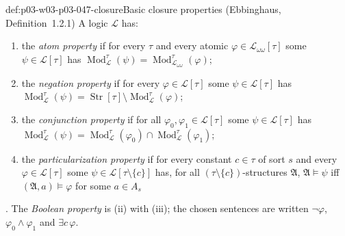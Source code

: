 \begin{hbdefinition}{def:p03-w03-p03-047-closure}{Basic closure properties (Ebbinghaus, Definition~1.2.1)}
A logic \(\mathscr L\) has:
\begin{enumerate}
 \item[(i)] the \emph{atom property} if for every \(\tau\) and every atomic
       \(\varphi\in\mathscr L_{\omega\omega}[\tau]\) some
       \(\psi\in\mathscr L[\tau]\) has
       \(\operatorname{Mod}^\tau_{\mathscr L}(\psi)=\operatorname{Mod}^\tau_{\mathscr L_{\omega\omega}}(\varphi)\);
 \item[(ii)] the \emph{negation property} if for every
       \(\varphi\in\mathscr L[\tau]\) some \(\psi\in\mathscr L[\tau]\) has
       \(\operatorname{Mod}^\tau_{\mathscr L}(\psi)=\operatorname{Str}[\tau]\setminus\operatorname{Mod}^\tau_{\mathscr L}(\varphi)\);
 \item[(iii)] the \emph{conjunction property} if for all
       \(\varphi_0,\varphi_1\in\mathscr L[\tau]\) some
       \(\psi\in\mathscr L[\tau]\) has
       \(\operatorname{Mod}^\tau_{\mathscr L}(\psi)=\operatorname{Mod}^\tau_{\mathscr L}(\varphi_0)\cap\operatorname{Mod}^\tau_{\mathscr L}(\varphi_1)\);
 \item[(iv)] the \emph{particularization property} if for every constant
       \(c\in\tau\) of sort \(s\) and every \(\varphi\in\mathscr L[\tau]\)
       some \(\psi\in\mathscr L[\tau\setminus\{c\}]\) has, for all
       \((\tau\setminus\{c\})\)-structures \(\mathfrak A\),
       \(\mathfrak A\models\psi\) iff \((\mathfrak A,a)\models\varphi\) for
       some \(a\in A_s\)
\end{enumerate}
\cite[Ch.~II, Definition~1.2.1, pp.~29--30]{Ebbinghaus1985ExtendedLogics}.
The \emph{Boolean property} is (ii) with (iii); the chosen sentences are
written \(\neg\varphi\), \(\varphi_0\land\varphi_1\) and \(\exists c\,\varphi\).
\end{hbdefinition}

